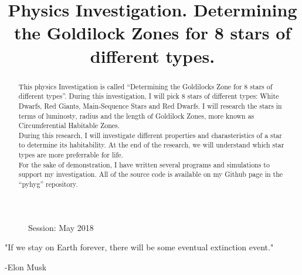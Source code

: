 \documentclass{article}
\title{Physics Investigation. Determining the Goldilock Zones for 8 stars of different types. }
\date{}
\author{}
\begin{document}
\maketitle


\begin{figure}
  \begin{flushleft}
    Session: May 2018\\
    \end{flushleft}
  \end{figure}



\tableofcontents
\newpage

\begin{center}
  "If we stay on Earth forever, there will be some eventual extinction event." 
\end{center}
\begin{flushright}
  -Elon Musk \cite{musk}
\end{flushright}


\begin{abstract}
  This physics Investigation is called ``Determining the Goldilocks Zone for 8 stars of different types''.
  During this investigation, I will pick 8 stars of different types: White Dwarfs, Red Giants, Main-Sequence Stars and Red Dwarfs.
  I will research the stars in terms of luminosty, radius and the length of Goldilock Zones, more known as Circumferential Habitable Zones.\\
  
  During this research, I will investigate different properties and charasteristics of a star to determine its habitability.
  At the end of the research, we will understand which star types are more preferrable for life.\\
  
  For the sake of demonstration, I have written several programs and simulations to support my investigation. All of the source code is available on my Github page in the ``pyhyg'' repository. \cite{github}\\
  
\end{abstract}
\end{document}
